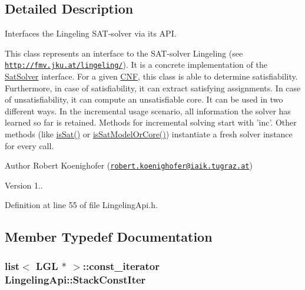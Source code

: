 \subsection{Detailed Description}
Interfaces the Lingeling S\-A\-T-\/solver via its A\-P\-I. 

This class represents an interface to the S\-A\-T-\/solver Lingeling (see \href{http://fmv.jku.at/lingeling/}{\tt http\-://fmv.\-jku.\-at/lingeling/}). It is a concrete implementation of the \hyperlink{classSatSolver}{Sat\-Solver} interface. For a given \hyperlink{classCNF}{C\-N\-F}, this class is able to determine satisfiability. Furthermore, in case of satisfiability, it can extract satisfying assignments. In case of unsatisfiability, it can compute an unsatisfiable core. It can be used in two different ways. In the incremental usage scenario, all information the solver has learned so far is retained. Methods for incremental solving start with 'inc'. Other methods (like \hyperlink{classLingelingApi_a38358f64ded244e2e3d843d0565f0177}{is\-Sat()} or \hyperlink{classLingelingApi_a8f147b59f0ebabc35a20d295f28d499f}{is\-Sat\-Model\-Or\-Core()}) instantiate a fresh solver instance for every call.

\begin{DoxyAuthor}{Author}
Robert Koenighofer (\href{mailto:robert.koenighofer@iaik.tugraz.at}{\tt robert.\-koenighofer@iaik.\-tugraz.\-at}) 
\end{DoxyAuthor}
\begin{DoxyVersion}{Version}
1.. 
\end{DoxyVersion}


Definition at line 55 of file Lingeling\-Api.\-h.



\subsection{Member Typedef Documentation}
\hypertarget{classLingelingApi_a5c16b047da9b5bd344f30a855dac52e7}{
\subsubsection[{Stack\-Const\-Iter}]{\setlength{\rightskip}{0pt plus 5cm}list$<$ L\-G\-L $\ast$ $>$\-::const\-\_\-iterator {\bf Lingeling\-Api\-::\-Stack\-Const\-Iter}\hspace{0.3cm}{\ttfamily [protected]}}}\label{classLingelingApi_a5c16b047da9b5bd344f30a855dac52e7}


